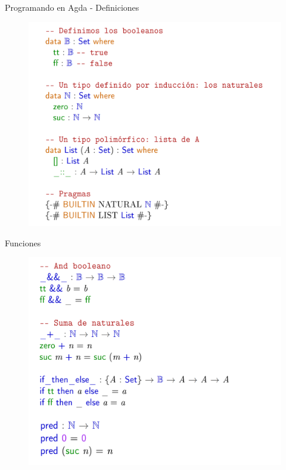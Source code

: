 \documentclass[11pt]{beamer}
\begin{document}
\begin{frame}{Programando en Agda - Definiciones}
\begin{figure}
\includegraphics[scale=0.5]{img/defs}
\end{figure}\end{frame}

\begin{frame}{Funciones}
\begin{figure}
\includegraphics[scale=0.4]{img/funcs}
\end{figure}\end{frame}
\end{document}
